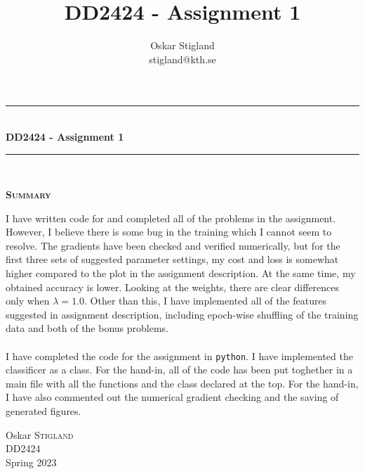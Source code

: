 \documentclass{article}
\title{DD2424 - Assignment 1}
\author{Oskar Stigland \\ stigland@kth.se}
\begin{document}

	\begin{titlepage}
		\begin{center} 
			
			\rule{\linewidth}{0.5mm}\\[0.5 cm]
			{ \huge \bfseries DD2424 - Assignment 1}\\[0.3 cm] %
			\rule{\linewidth}{0.5mm}\\[1 cm]
					
			\small\vfill
			\begin{center}
			\centering
			{\large \bfseries \textsc{Summary}}\\
			\vspace{1cm}
			\begin{minipage}{10cm}
				
				I have written code for and completed all of the problems in the assignment. However, I believe there is some bug in the training which I cannot seem to resolve. The gradients have been checked and verified numerically, but for the first three sets of suggested parameter settings, my cost and loss is somewhat higher compared to the plot in the assignment description. At the same time, my obtained accuracy is lower. Looking at the weights, there are clear differences only when $\lambda = 1.0$. Other than this, I have implemented all of the features suggested in assignment description, including epoch-wise shuffling of the training data and both of the bonus problems.\\\\
%
	I have completed the code for the assignment in \texttt{python}. I have implemented the classificer as a class. For the hand-in, all of the code has been put toghether in a main file with all the functions and the class declared at the top. For the hand-in, I have also commented out the numerical gradient checking and the saving of generated figures. 
			\end{minipage}
			\end{center}
			\large\vfill
						

		\end{center}	
		
		\begin{minipage}{0.4\textwidth}
			\begin{flushleft} \large
				Oskar \textsc{Stigland}\\
				DD2424\\
				Spring 2023
			\end{flushleft}
		\end{minipage}	

	\end{titlepage}
\end{document}

